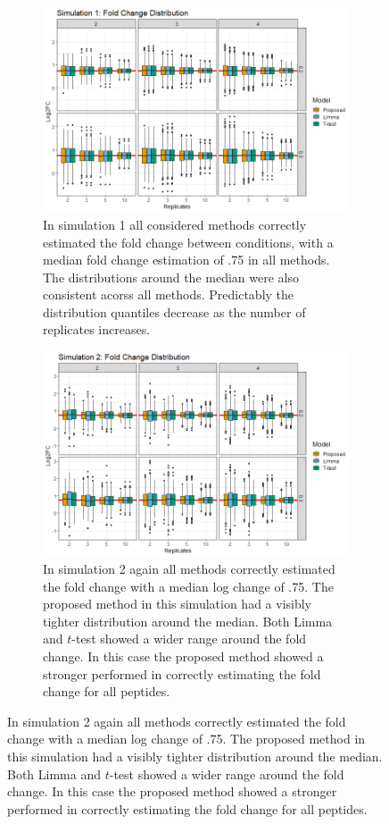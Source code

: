 \documentclass{mcp}
\begin{document}
\begin{figure}[h!]
\centering
 \begin{subfigure}{.9\textwidth}
	\includegraphics[width=.9\textwidth]{sim_new/sim1_FC_boxplot}
	\caption{In simulation 1 all considered methods correctly estimated the fold change between conditions, with a median fold change estimation of .75 in all methods. The distributions around the median were also consistent acorss all methods. Predictably the distribution quantiles decrease as the number of replicates increases.}
 \end{subfigure}
 \begin{subfigure}{.9\textwidth}
	\includegraphics[width=.9\textwidth]{sim_new/sim3_FC_boxplot}
	\caption{In simulation 2 again all methods correctly estimated the fold change with a median log change of .75. The proposed method in this simulation had a visibly tighter distribution around the median. Both Limma and $t$-test showed a wider range around the fold change. In this case the proposed method showed a stronger performed in correctly estimating the fold change for all peptides.}
 \end{subfigure}
\label{fig:fc_boxplot}
\end{figure}
\end{document}
